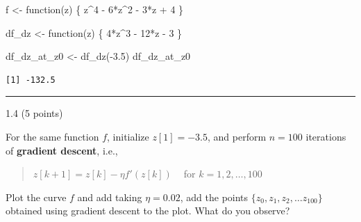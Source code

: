 \documentclass[
  letterpaper,
  DIV=11,
  numbers=noendperiod]{scrartcl}
\newenvironment{Shaded}{\begin{snugshade}}{\end{snugshade}}
\newcommand{\ControlFlowTok}[1]{\textcolor[rgb]{0.00,0.23,0.31}{#1}}
\newcommand{\DecValTok}[1]{\textcolor[rgb]{0.68,0.00,0.00}{#1}}
\newcommand{\FloatTok}[1]{\textcolor[rgb]{0.68,0.00,0.00}{#1}}
\newcommand{\FunctionTok}[1]{\textcolor[rgb]{0.28,0.35,0.67}{#1}}
\newcommand{\NormalTok}[1]{\textcolor[rgb]{0.00,0.23,0.31}{#1}}
\newcommand{\OtherTok}[1]{\textcolor[rgb]{0.00,0.23,0.31}{#1}}
\newcommand{\SpecialCharTok}[1]{\textcolor[rgb]{0.37,0.37,0.37}{#1}}
\begin{document}
\begin{Shaded}
\begin{Highlighting}[]
\NormalTok{f }\OtherTok{\textless{}{-}} \ControlFlowTok{function}\NormalTok{(z) \{}
\NormalTok{  z}\SpecialCharTok{\^{}}\DecValTok{4} \SpecialCharTok{{-}} \DecValTok{6}\SpecialCharTok{*}\NormalTok{z}\SpecialCharTok{\^{}}\DecValTok{2} \SpecialCharTok{{-}} \DecValTok{3}\SpecialCharTok{*}\NormalTok{z }\SpecialCharTok{+} \DecValTok{4}
\NormalTok{\}}


\NormalTok{df\_dz }\OtherTok{\textless{}{-}} \ControlFlowTok{function}\NormalTok{(z) \{}
  \DecValTok{4}\SpecialCharTok{*}\NormalTok{z}\SpecialCharTok{\^{}}\DecValTok{3} \SpecialCharTok{{-}} \DecValTok{12}\SpecialCharTok{*}\NormalTok{z }\SpecialCharTok{{-}} \DecValTok{3}
\NormalTok{\}}


\NormalTok{df\_dz\_at\_z0 }\OtherTok{\textless{}{-}} \FunctionTok{df\_dz}\NormalTok{(}\SpecialCharTok{{-}}\FloatTok{3.5}\NormalTok{)}
\NormalTok{df\_dz\_at\_z0}
\end{Highlighting}
\end{Shaded}

\begin{verbatim}
[1] -132.5
\end{verbatim}

\begin{center}\rule{0.5\linewidth}{0.5pt}\end{center}

1.4 (5 points)

For the same function \(f\), initialize \(z[1] = -3.5\), and perform
\(n=100\) iterations of \textbf{gradient descent}, i.e.,

\begin{quote}
\(z[{k+1}] = z[k] - \eta f'(z[k]) \ \ \ \ \) for
\(k = 1, 2, \dots, 100\)
\end{quote}

Plot the curve \(f\) and add taking \(\eta = 0.02\), add the points
\(\{z_0, z_1, z_2, \dots z_{100}\}\) obtained using gradient descent to
the plot. What do you observe?
\end{document}

